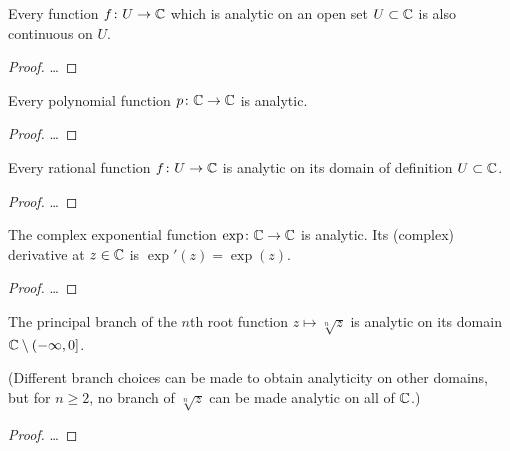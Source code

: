 \begin{lemma}
  \label{lem:analytic_implies_continuous}
  Every function $f \colon U \to \mathbb{C}$ which is analytic on
  an open set $U \subset \mathbb{C}$ is also continuous on $U$.
\end{lemma}
\begin{proof}
  \ldots
\end{proof}

\begin{lemma}
  \label{lem:polynomial_analytic}
  Every polynomial function $p \colon \mathbb{C} \to \mathbb{C}$ is analytic.
\end{lemma}
\begin{proof}
  \ldots
\end{proof}

\begin{lemma}
  \label{lem:rational_function_analytic}
  Every rational function $f \colon U \to \mathbb{C}$ is analytic
  on its domain of definition $U \subset \mathbb{C}$.
\end{lemma}
\begin{proof}
  \ldots
\end{proof}

\begin{lemma}
  \label{lem:exp_analytic}
  The complex exponential function $\exp \colon \mathbb{C} \to \mathbb{C}$ is analytic.
  Its (complex) derivative at $z \in \mathbb{C}$ is $\exp'(z) = \exp(z)$.
\end{lemma}
\begin{proof}
  \ldots
\end{proof}

\begin{lemma}
  \label{lem:root_function_analytic}
  The principal branch of the $n$th root function
  $z \mapsto \sqrt[n]{z}$ is analytic on its domain
  $\mathbb{C} \setminus (-\infty,0]$.

  (Different branch choices can be made to obtain analyticity on
  other domains, but for $n \ge 2$,
  no branch of $\sqrt[n]{z}$ can be made analytic on all of $\mathbb{C}$.)
\end{lemma}
\begin{proof}
  \ldots
\end{proof}



